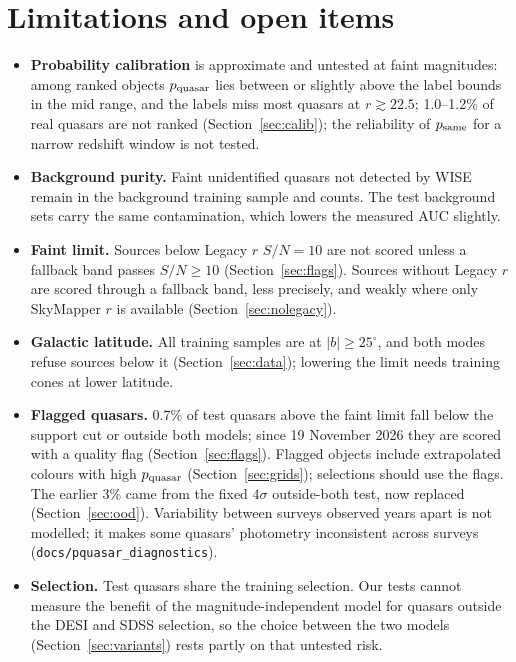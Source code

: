 \documentclass[11pt,a4paper]{article}
\newcommand{\code}[1]{\texttt{#1}}
\begin{document}
\section{Limitations and open items}\label{sec:limits}
\begin{itemize}
\item \textbf{Probability calibration} is approximate and untested at faint magnitudes: among ranked objects
  $p_{\rm quasar}$ lies between or slightly above the label bounds in the mid range, and the labels miss most
  quasars at $r\gtrsim22.5$; 1.0--1.2\% of real quasars are not ranked (Section~\ref{sec:calib}); the reliability of $p_{\rm same}$
  for a narrow redshift window is not tested.
\item \textbf{Background purity.} Faint unidentified quasars not detected by WISE remain in the background
  training sample and counts. The test background sets carry the same contamination, which lowers the
  measured AUC slightly.
\item \textbf{Faint limit.} Sources below Legacy $r$ $S/N=10$ are not scored unless a fallback band passes
  $S/N\geq10$ (Section~\ref{sec:flags}). Sources without Legacy $r$ are
  scored through a fallback band, less precisely, and weakly where only SkyMapper $r$ is available
  (Section~\ref{sec:nolegacy}).
\item \textbf{Galactic latitude.} All training samples are at $|b|\geq25^\circ$, and both modes refuse sources below
  it (Section~\ref{sec:data}); lowering the limit needs training cones at lower latitude.
\item \textbf{Flagged quasars.} 0.7\% of test quasars above the faint limit fall below the support cut or outside both
  models; since 19 November 2026 they are scored with a quality flag (Section~\ref{sec:flags}). Flagged objects
  include extrapolated colours with high $p_{\rm quasar}$ (Section~\ref{sec:grids}); selections should use the flags. The earlier 3\% came from the fixed $4\sigma$ outside-both test, now replaced (Section~\ref{sec:ood}).
  Variability between surveys observed years apart is not modelled; it makes some quasars' photometry
  inconsistent across surveys (\code{docs/pquasar\_diagnostics}).
\item \textbf{Selection.} Test quasars share the training selection. Our tests cannot measure the benefit
  of the magnitude-independent model for quasars outside the DESI and SDSS selection, so the choice between
  the two models (Section~\ref{sec:variants}) rests partly on that untested risk.

\end{itemize}
\end{document}
